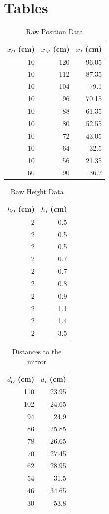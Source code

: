 \section{Tables}
%
\begin{table}[ht]
    \centering
    \begin{tabular}{|r|r|r|}
        \hline
        $x_{O}$ (cm) & $x_{M}$ (cm) & $x_{I}$ (cm) \\
        \hline
        10 & 120 & 96.05 \\
        10 & 112 & 87.35 \\
        10 & 104 & 79.1 \\
        10 & 96 & 70.15 \\
        10 & 88 & 61.35 \\
        10 & 80 & 52.55 \\
        10 & 72 & 43.05 \\
        10 & 64 & 32.5 \\
        10 & 56 & 21.35 \\
        60 & 90 & 36.2 \\
        \hline
    \end{tabular}
    \caption{Raw Position Data}
    \label{table.07.position}
\end{table}
%
\begin{table}[ht]
    \centering
    \begin{tabular}{|r|r|}
        \hline
        $h_{O}$ (cm) & $h_{I}$ (cm) \\
        \hline
        2 & 0.5 \\
        2 & 0.5 \\
        2 & 0.5 \\
        2 & 0.7 \\
        2 & 0.7 \\
        2 & 0.8 \\
        2 & 0.9 \\
        2 & 1.1 \\
        2 & 1.4 \\
        2 & 3.5 \\
        \hline
    \end{tabular}
    \caption{Raw Height Data}
    \label{table.07.height}
\end{table}
%
\begin{table}[ht]
    \centering
    \begin{tabular}{|r|r|}
        \hline
        $d_{O}$ (cm) & $d_{I}$ (cm) \\
        \hline
        110 & 23.95 \\
        102 & 24.65 \\
        94 & 24.9 \\
        86 & 25.85 \\
        78 & 26.65 \\
        70 & 27.45 \\
        62 & 28.95 \\
        54 & 31.5 \\
        46 & 34.65 \\
        30 & 53.8 \\
        \hline
    \end{tabular}
    \caption{Distances to the mirror}
    \label{table.07.distance}
\end{table}
